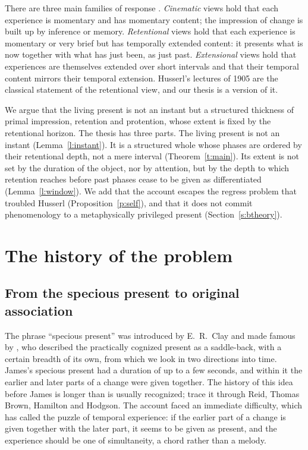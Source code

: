 \documentclass{situationist-preprint}
\begin{document}
There are three main families of response \citep{Dainton2000}. \emph{Cinematic} views hold that each experience is momentary and has momentary content; the impression of change is built up by inference or memory. \emph{Retentional} views hold that each experience is momentary or very brief but has temporally extended content: it presents what is now together with what has just been, as just past. \emph{Extensional} views hold that experiences are themselves extended over short intervals and that their temporal content mirrors their temporal extension. Husserl's lectures of 1905 are the classical statement of the retentional view, and our thesis is a version of it.

We argue that the living present is not an instant but a structured thickness of primal impression, retention and protention, whose extent is fixed by the retentional horizon. The thesis has three parts. The living present is not an instant (Lemma~\ref{l:instant}). It is a structured whole whose phases are ordered by their retentional depth, not a mere interval (Theorem~\ref{t:main}). Its extent is not set by the duration of the object, nor by attention, but by the depth to which retention reaches before past phases cease to be given as differentiated (Lemma~\ref{l:window}). We add that the account escapes the regress problem that troubled Husserl (Proposition~\ref{p:self}), and that it does not commit phenomenology to a metaphysically privileged present (Section~\ref{s:btheory}).

\section{The history of the problem}\label{s:history}

\subsection{From the specious present to original association}

The phrase \enquote{specious present} was introduced by E.~R.~Clay and made famous by \citet[ch.~15]{James1890}, who described the practically cognized present as a saddle-back, with a certain breadth of its own, from which we look in two directions into time. James's specious present had a duration of up to a few seconds, and within it the earlier and later parts of a change were given together. The history of this idea before James is longer than is usually recognized; \citet{AndersenGrush2009} trace it through Reid, Thomas Brown, Hamilton and Hodgson. The account faced an immediate difficulty, which \citet{Kelly2005} has called the puzzle of temporal experience: if the earlier part of a change is given together with the later part, it seems to be given as present, and the experience should be one of simultaneity, a chord rather than a melody.
\end{document}
